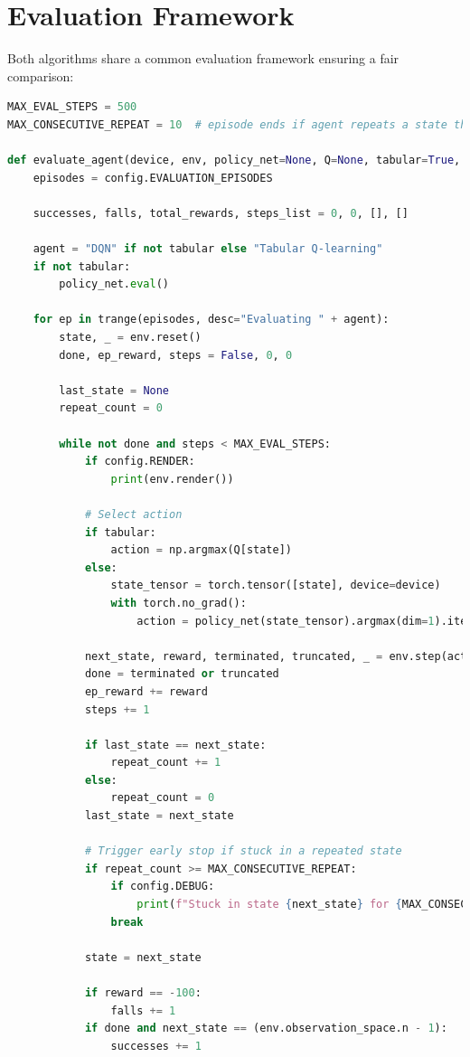\documentclass[a4paper,12pt]{article}
\begin{document}
\section{Evaluation Framework}
Both algorithms share a common evaluation framework ensuring a fair comparison:
\begin{lstlisting}[language=Python]
MAX_EVAL_STEPS = 500
MAX_CONSECUTIVE_REPEAT = 10  # episode ends if agent repeats a state this many times in a row

def evaluate_agent(device, env, policy_net=None, Q=None, tabular=True, random_start=False):
    episodes = config.EVALUATION_EPISODES

    successes, falls, total_rewards, steps_list = 0, 0, [], []

    agent = "DQN" if not tabular else "Tabular Q-learning"
    if not tabular:
        policy_net.eval()

    for ep in trange(episodes, desc="Evaluating " + agent):
        state, _ = env.reset()
        done, ep_reward, steps = False, 0, 0

        last_state = None
        repeat_count = 0

        while not done and steps < MAX_EVAL_STEPS:
            if config.RENDER:
                print(env.render())

            # Select action
            if tabular:
                action = np.argmax(Q[state])
            else:
                state_tensor = torch.tensor([state], device=device)
                with torch.no_grad():
                    action = policy_net(state_tensor).argmax(dim=1).item()

            next_state, reward, terminated, truncated, _ = env.step(action)
            done = terminated or truncated
            ep_reward += reward
            steps += 1

            if last_state == next_state:
                repeat_count += 1
            else:
                repeat_count = 0
            last_state = next_state

            # Trigger early stop if stuck in a repeated state
            if repeat_count >= MAX_CONSECUTIVE_REPEAT:
                if config.DEBUG:
                    print(f"Stuck in state {next_state} for {MAX_CONSECUTIVE_REPEAT} steps. Ending episode early.")
                break

            state = next_state

            if reward == -100:
                falls += 1
            if done and next_state == (env.observation_space.n - 1):
                successes += 1


\end{lstlisting}
\end{document}
